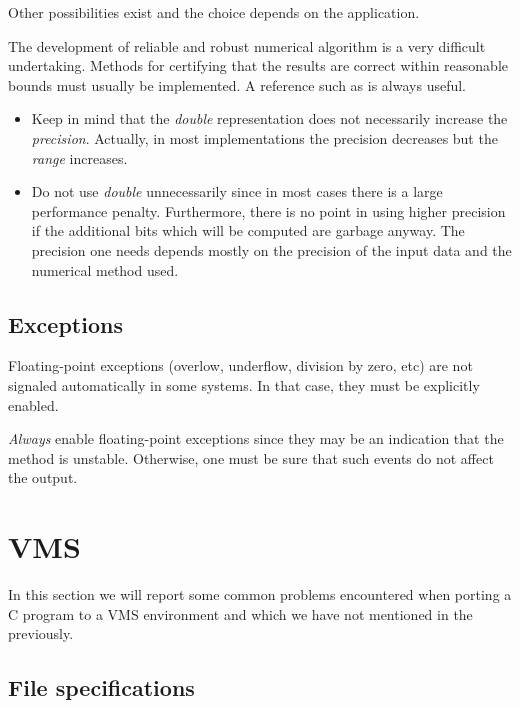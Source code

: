 Other possibilities exist and the choice depends on the application.

The development of reliable and robust numerical algorithm is a very
difficult undertaking. Methods for certifying that the results are
correct within reasonable bounds must usually be implemented.
A reference such as \cite{kn:NRC} is always useful.

\begin{itemize}

\item Keep in mind that the {\em double} representation does not
 necessarily increase the {\em precision}. Actually, in most implementations
 the precision decreases but the {\em range} increases.

\item Do not use {\em double} unnecessarily since in most cases there is
 a large performance penalty. Furthermore, there is no point in using higher
 precision if the additional bits which will be computed are garbage anyway.
 The precision one needs depends mostly on the precision of the input data
 and the numerical method used.

\end{itemize}

\subsection{Exceptions}

Floating-point exceptions (overlow, underflow, division by zero, etc)
are not signaled automatically in some systems. In that case, they
must be explicitly enabled.

{\em Always} enable floating-point exceptions since they may be an
indication that the method is unstable. Otherwise, one must be sure
that such events do not affect the output.

\section{VMS}

In this section we will report some common problems encountered when
porting a C program to a VMS environment and which we have not mentioned
in the previously.

\subsection{File specifications}

